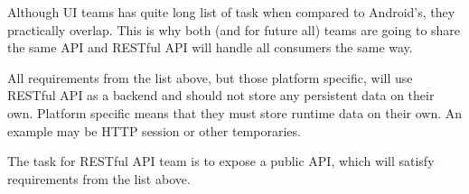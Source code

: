 	Although UI teams has quite long list of task when compared to Android's, they practically overlap.
	This is why both (and for future all) teams are going to share the same API and RESTful API will handle all consumers
	the same way.

	All requirements from the list above, but those platform specific, will use RESTful API as a backend and should not
	store any persistent data on their own. Platform specific means that they must store runtime data on their own. An
	example may be HTTP session or other temporaries.

	The task for RESTful API team is to expose a public API, which will satisfy requirements from the list above.
	 